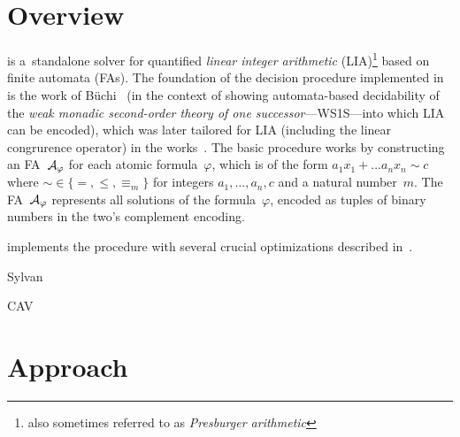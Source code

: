 \documentclass[acmsmall,screen,nonacm=true]{acmart}
\begin{document}
\vspace{-0.0mm}
\section{Overview}
\vspace{-0.0mm}

\amaya is a~standalone solver for quantified \emph{linear integer arithmetic}
(LIA)\footnote{also sometimes referred to as \emph{Presburger arithmetic}}
based on finite automata (FAs).
The foundation of the decision procedure implemented in \amaya 
is the work of B\"{u}chi~\cite{Buchi60} (in the context of showing
automata-based decidability of the \emph{weak monadic second-order theory of
one successor}---WS1S---into which LIA can be encoded), which was later
tailored for LIA (including the linear congrurence operator) in the
works~\cite{BoudetC96,BoigelotJW05,Durand-GasselinH10}.
The basic procedure works by constructing an FA~$\mathcal{A}_{\varphi}$ for each atomic formula~$\varphi$, which
is of the form $a_1 x_1 + \ldots a_n x_n \sim c$ where ${\sim} \in \{{=},
{\leq}, {\equiv_m}\}$ for integers $a_1, \ldots, a_n, c$ and a natural
number~$m$.
The FA~$\mathcal{A}_{\varphi}$ represents all solutions of the formula~$\varphi$,
encoded as tuples of binary numbers in the two's complement encoding.

\amaya implements the procedure with several crucial optimizations described in~\cite{HabermehlHHHL24}.


\ol{}

Sylvan~\cite{DijkP15}

CAV \cite{HabermehlHHHL24}


\vspace{-0.0mm}
\section{Approach}\label{sec:label}
\vspace{-0.0mm}








\end{document}
